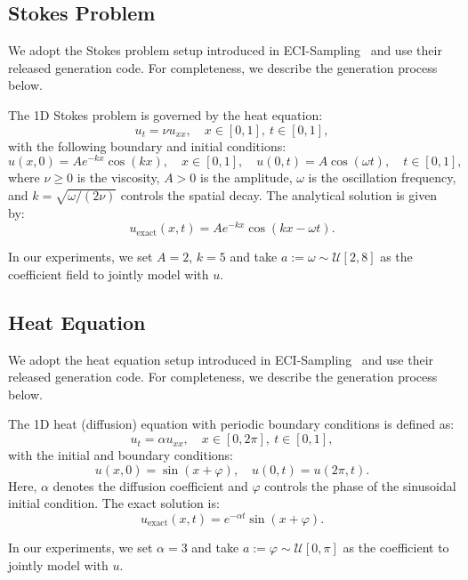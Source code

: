 \documentclass{article}
\theoremstyle{plain}
\theoremstyle{definition}
\theoremstyle{remark}
\begin{document}
\subsection{Stokes Problem}
We adopt the Stokes problem setup introduced in ECI-Sampling~\cite{cheng2025eci} and use their released generation code. For completeness, we describe the generation process below.

The 1D Stokes problem is governed by the heat equation:
\[
u_t = \nu u_{xx}, \quad x \in [0, 1],\ t \in [0, 1],
\]
with the following boundary and initial conditions:
\[
u(x, 0) = Ae^{-kx} \cos(kx), \quad x \in [0,1], \quad u(0, t) = A \cos(\omega t), \quad t \in [0,1],
\]
where $\nu \geq 0$ is the viscosity, $A > 0$ is the amplitude, $\omega$ is the oscillation frequency, and $k = \sqrt{\omega / (2 \nu)}$ controls the spatial decay. The analytical solution is given by:
\[
u_{\text{exact}}(x, t) = Ae^{-kx} \cos(kx - \omega t).
\]

In our experiments, we set $A = 2$, $k = 5$ and take $a:=\omega \sim \mathcal{U}[2, 8]$ as the coefficient field to jointly model with $u$.

\subsection{Heat Equation}
We adopt the heat equation setup introduced in ECI-Sampling~\cite{cheng2025eci} and use their released generation code. For completeness, we describe the generation process below.

The 1D heat (diffusion) equation with periodic boundary conditions is defined as:
\[
u_t = \alpha u_{xx}, \quad x \in [0, 2\pi],\ t \in [0, 1],
\]
with the initial and boundary conditions:
\[
u(x, 0) = \sin(x + \varphi), \quad u(0, t) = u(2\pi, t).
\]
Here, $\alpha$ denotes the diffusion coefficient and $\varphi$ controls the phase of the sinusoidal initial condition. The exact solution is:
\[
u_{\text{exact}}(x, t) = e^{-\alpha t} \sin(x + \varphi).
\]

In our experiments, we set $\alpha=3$ and take $a:=\varphi \sim \mathcal{U}[0, \pi]$ as the coefficient to jointly model with $u$.
\end{document}

